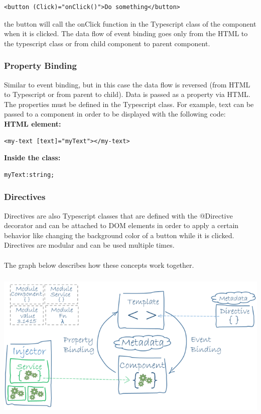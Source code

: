 \begin{Verbatim}[frame=single]
 <button (Click)="onClick()">Do something</button>
\end{Verbatim}

the button will call the onClick function in the Typescript class of the component when it is clicked. The data flow of event binding goes only from the HTML to the typescript class or from child component to parent component.
\pagebreak
\subsubsection{Property Binding}
Similar to event binding, but in this case the data flow is reversed (from HTML to Typescript or from parent to child). Data is passed as a property via HTML. The properties must be defined in the Typescript class. For example, text can be passed to a component in order to be displayed with the following code:\\[0.5cm]
\textbf{HTML element:}
\begin{Verbatim}[frame=single]
 <my-text [text]="myText"></my-text>
\end{Verbatim}
\textbf{Inside the class:}
\begin{Verbatim}[frame=single]
 myText:string;
\end{Verbatim}

\subsubsection{Directives}
Directives are also Typescript classes that are defined with the @Directive decorator and can be attached to DOM elements in order to apply a certain behavior like changing the background color of a button while it is clicked. Directives are modular and can be used multiple times.\\\\
The graph below describes how these concepts work together. \\[0.5cm]
\includegraphics [height=8cm, width=15cm] {images/angular-component-structure}
\pagebreak

